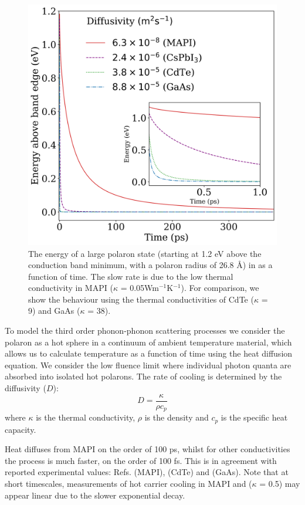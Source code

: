 \begin{figure}[h]
\centering
  \includegraphics[width=1.0\textwidth]{figures/ch5/f4.png}
  \caption{The energy of a large polaron state (starting at 1.2 eV above the conduction band minimum, with a polaron radius of 26.8 \AA) 
  in  as a function of time.
  The slow rate is due to the low thermal conductivity in MAPI ($\kappa$ = 0.05Wm$^{-1}$K$^{-1}$). 
  For comparison, we show the behaviour using the thermal conductivities of 
  CdTe ($\kappa$ = 9) and GaAs ($\kappa$ = 38). }
  \label{ch5TemperatureTime}
\end{figure}

To model the third order phonon-phonon scattering processes we consider the polaron as a hot sphere in a continuum of ambient temperature material, which allows us to calculate temperature as a function of time using the heat diffusion equation.
We consider the low fluence limit where individual photon quanta are absorbed into isolated hot polarons.
The rate of cooling is determined by the diffusivity ($D$): 
\begin{equation}
    D= \frac{\kappa}{\rho c_p}
\end{equation} 
where $\kappa$ is the thermal conductivity, $\rho$ is the density and $c_p$ is the specific heat capacity. 

Heat diffuses from MAPI on the order of 100 ps, whilst for other conductivities the process is much faster, on the order of 100 fs. 
This is in agreement with reported experimental values: Refs. \cite{Klein2016} (MAPI), \cite{Zhong2017} (CdTe) and \cite{Rosenwaks1993} (GaAs). 
Note that at short timescales, measurements of hot carrier cooling in MAPI and ($\kappa$ = 0.5) may appear linear due to the slower exponential decay.

